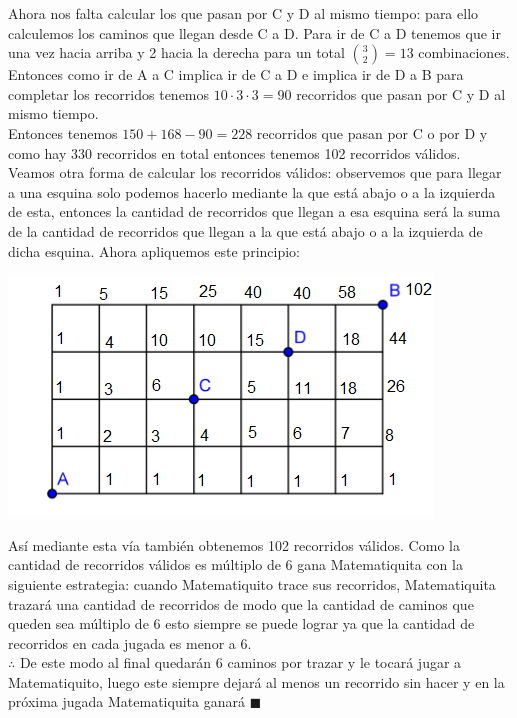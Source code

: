 \documentclass{book}
\begin{document}
\begin{enumerate}
          Ahora nos falta calcular los que pasan por C y D al mismo tiempo: para ello calculemos los caminos que llegan desde C a D. Para ir de C a D tenemos que ir una vez hacia arriba y 2 hacia la derecha para un total $\displaystyle{3 \choose 2}=13$ combinaciones. Entonces como ir de A a C implica ir de C a D e implica ir de D a B para completar los recorridos tenemos $10\cdot 3\cdot 3=90$ recorridos que pasan por C y D al mismo tiempo.\\
          Entonces tenemos $150+168-90=228$ recorridos que pasan por C o por D y como hay 330 recorridos en total entonces tenemos 102 recorridos válidos.\\
          Veamos otra forma de calcular los recorridos válidos: observemos que para llegar a una esquina solo podemos hacerlo mediante la que está abajo o a la izquierda de esta, entonces la cantidad de recorridos que llegan a esa esquina será la suma de la cantidad de recorridos que llegan a la que está abajo o a la izquierda de dicha esquina. Ahora apliquemos este principio:
          \begin{center}
              \includegraphics[scale=1]{imagenes/Combinatoria/Copia13.png}
          \end{center}
          Así mediante esta vía también obtenemos 102 recorridos válidos. Como la cantidad de recorridos válidos es múltiplo de 6 gana Matematiquita con la siguiente estrategia: cuando Matematiquito trace sus recorridos, Matematiquita trazará una cantidad de recorridos de modo que la cantidad de caminos que queden sea múltiplo de 6 esto siempre se puede lograr ya que la cantidad de recorridos en cada jugada es menor a 6. \\
          $\therefore$ De este modo al final quedarán 6 caminos por trazar y le tocará jugar a Matematiquito, luego este siempre dejará al menos un recorrido sin hacer y en la próxima jugada Matematiquita ganará $\blacksquare$\\

\end{enumerate}
\end{document}
